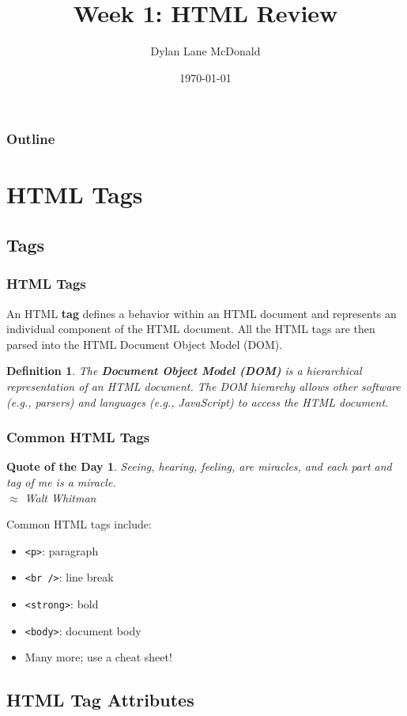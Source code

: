 \documentclass[aspectratio=169]{beamer}
\title{Week 1: HTML Review}
\author{Dylan Lane McDonald}
\institute{CNM STEMulus Center\\Web Development with PHP}
\date{\today}
\newtheorem{defn}{Definition}
\newtheorem{qotd}{Quote of the Day}
\begin{document}
\lstset{language=HTML}
\begin{frame}
\titlepage
\end{frame}

\begin{frame}
\frametitle{Outline}
\tableofcontents
\end{frame}

\section{HTML Tags}
\subsection{Tags}
\begin{frame}
\frametitle{HTML Tags}
An HTML \textbf{tag} defines a behavior within an HTML document and represents an individual component of the HTML document. All the HTML tags are then parsed into the HTML Document Object Model (DOM).
\pause
\begin{defn}
The \textbf{Document Object Model (DOM)} is a hierarchical representation of an HTML document. The DOM hierarchy allows other software (e.g., parsers) and languages (e.g., JavaScript) to access the HTML document.
\end{defn}
\end{frame}

\begin{frame}
\frametitle{Common HTML Tags}
\begin{qotd}
Seeing, hearing, feeling, are miracles, and each part and tag of me is a miracle.\\
$\approx$ Walt Whitman
\end{qotd}
\pause

Common HTML tags include:
\begin{itemize}
	\item \texttt{<p>}: paragraph
	\item \texttt{<br />}: line break
	\item \texttt{<strong>}: bold
	\item \texttt{<body>}: document body
	\item Many more; use a cheat sheet! \cite{cheatography, w3schools}
\end{itemize}
\end{frame}

\subsection{HTML Tag Attributes}
\end{document}
